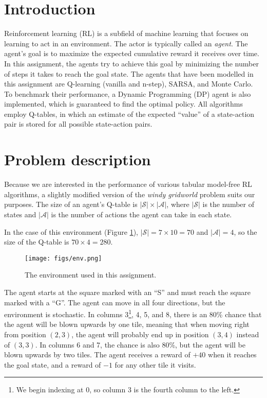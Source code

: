 \documentclass{article}
\begin{document}
\section{Introduction}
\label{sec:intro}

Reinforcement learning (RL) is a subfield of machine learning that focuses on learning to act in an environment.
The actor is typically called an \textit{agent}.
The agent's goal is to maximize the expected cumulative reward it receives over time.
In this assignment, the agents try to achieve this goal by minimizing the number of steps it takes to reach the goal state.
The agents that have been modelled in this assignment are Q-learning (vanilla and n-step), SARSA, and Monte Carlo.
To benchmark their performance, a Dynamic Programming (DP) agent is also implemented, which is guaranteed to find the optimal policy.
All algorithms employ Q-tables, in which an estimate of the expected ``value'' of a state-action pair is stored for all possible state-action pairs.

\section{Problem description}
\label{sec:problem}

Because we are interested in the performance of various tabular model-free RL algorithms, a slightly modified version of the \textit{windy gridworld} problem \cite{SuttonBarto2018} suits our purposes.
The size of an agent's Q-table is $|\mathcal{S}| \times |\mathcal{A}|$, where $|\mathcal{S}|$ is the number of states and $|\mathcal{A}|$ is the number of actions the agent can take in each state.

In the case of this environment (Figure \ref{fig:env}), $|\mathcal{S}| = 7 \times 10 = 70$ and $|\mathcal{A}| = 4$, so the size of the Q-table is $70 \times 4 = 280$.

\begin{figure}[htbp]
    \centering
    \texttt{[image: figs/env.png]}
    \caption{The environment used in this assignment.}
    \label{fig:env}
\end{figure}

\newcommand{\fnZeroIndex}{\footnote{We begin indexing at 0, so column 3 is the fourth column to the left.}}

The agent starts at the square marked with an ``S'' and must reach the square marked with a ``G''.
The agent can move in all four directions, but the environment is stochastic.
In columns 3\fnZeroIndex, 4, 5, and 8, there is an 80\% chance that the agent will be blown upwards by one tile, meaning that when moving right from position $(2, 3)$, the agent will probably end up in position $(3, 4)$ instead of $(3, 3)$.
In columns 6 and 7, the chance is also 80\%, but the agent will be blown upwards by two tiles.
The agent receives a reward of $+40$ when it reaches the goal state, and a reward of $-1$ for any other tile it visits.
\end{document}
